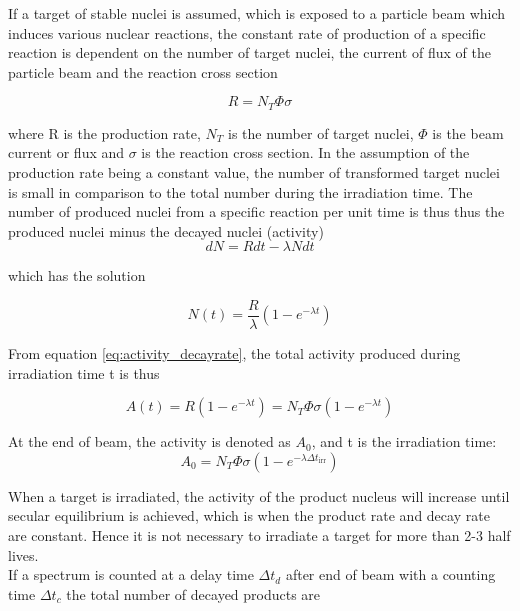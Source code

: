 \documentclass[a4paper,11pt,twoside]{book}
\begin{document}
\noindent 
If a target of stable nuclei is assumed, which is exposed to a particle beam which induces various nuclear reactions, the constant rate of production of a specific reaction is dependent on the number of target nuclei, the current of flux of the particle beam and the reaction cross section

\begin{equation}
    R = N_T \Phi \sigma
\end{equation}

\noindent 
where R is the production rate, $N_T$ is the number of target nuclei, $\Phi$ is the beam current or flux and $\sigma$ is the reaction cross section. In the assumption of the production rate being a constant value, the number of transformed target nuclei is small in comparison to the total number during the irradiation time. The number of produced nuclei from a specific reaction per unit time is thus thus the produced nuclei minus the decayed nuclei (activity)
\begin{equation}
    dN = Rdt - \lambda N dt
\end{equation}

which has the solution

\begin{equation}
    N(t) = \frac{R}{\lambda}(1-e^{-\lambda t})
\end{equation}

From equation \ref{eq:activity_decayrate}, the total activity produced during irradiation time t is thus 

\begin{equation} 
    A(t) = R(1-e^{-\lambda t}) = N_T \Phi \sigma (1-e^{-\lambda t})
\end{equation}

At the end of beam, the activity is denoted as $A_0$, and t is the irradiation time:
\begin{equation} \label{eq:activity_eob}
    A_0 = N_T \Phi \sigma (1-e^{-\lambda \Delta t_\text{irr}})
\end{equation}

\noindent 
When a target is irradiated, the activity of the product nucleus will increase until secular equilibrium is achieved, which is when the product rate and decay rate are constant. Hence it is not necessary to irradiate a target for more than 2-3 half lives.\\

\noindent 
If a spectrum is counted at a delay time $\Delta t_d$ after end of beam with a counting time $\Delta t_c$  the total number of decayed products are 
\end{document}

